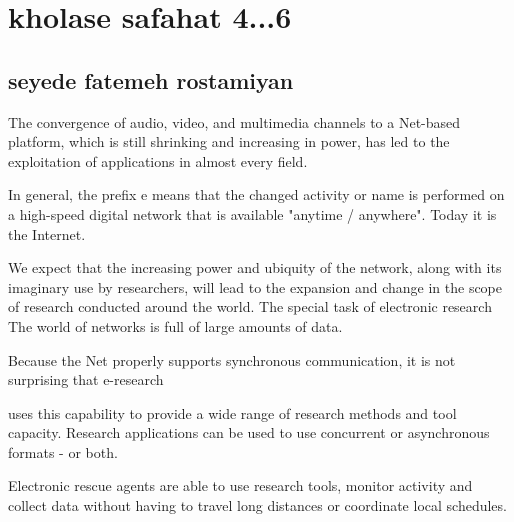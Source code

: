 \documentclass [12pt]{beamer}
\begin{document}
\section*{kholase safahat 4...6}
\subsection*{seyede fatemeh rostamiyan}	
\begin{frame}
\justifying	
The convergence of audio, video, and multimedia channels to a Net-based platform, which is still shrinking and increasing in power, has led to the exploitation of applications in almost every field.

In general, the prefix e means that the changed activity or name is performed on a high-speed digital network that is available "anytime / anywhere".  Today it is the Internet.
\end{frame}	
\begin{frame}
\justifying	
 We expect that the increasing power and ubiquity of the network, along with its imaginary use by researchers, will lead to the expansion and change in the scope of research conducted around the world.  The special task of electronic research The world of networks is full of large amounts of data.

Because the Net properly supports synchronous communication, it is not surprising that e-research
\end{frame}
\begin{frame}
\justifying	
uses this capability to provide a wide range of research methods and tool capacity.  Research applications can be used to use concurrent or asynchronous formats - or both.

Electronic rescue agents are able to use research tools, monitor activity and collect data without having to travel long distances or coordinate local schedules.

\end{frame}
\end{document}
